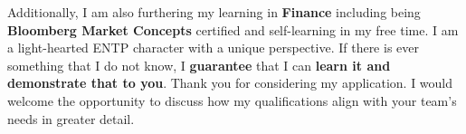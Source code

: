 \documentclass[10.5pt,a4]{article}
\begin{document}



Additionally, I am also furthering my learning in \textbf{Finance} including being \textbf{Bloomberg Market Concepts} certified and self-learning in my free time. I am a light-hearted ENTP character with a unique perspective. If there is ever something that I do not know, I \textbf{guarantee} that I can \textbf{learn it and demonstrate that to you}. Thank you for considering my application. I would welcome the opportunity to discuss how my qualifications align with your team's needs in greater detail.
\end{document}
